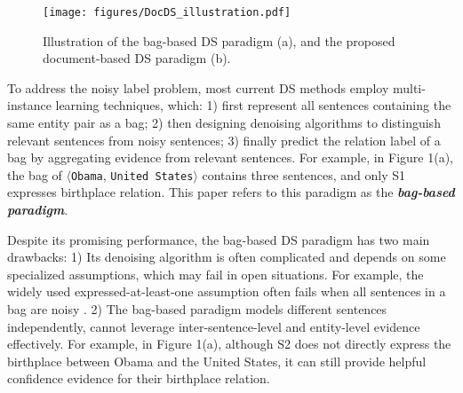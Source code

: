 \documentclass[11pt,a4paper]{article}
\begin{document}
  \begin{figure}[!tbp]
    \setlength{\belowcaptionskip}{-1em}
    \centering  
    \texttt{[image: figures/DocDS\_illustration.pdf]}
   \caption{Illustration of the bag-based DS paradigm (a), and the proposed document-based DS paradigm (b).}
    \label{fig:fig1}
  \end{figure}
  
  To address the noisy label problem, most current DS methods \cite{riedel_modeling_2010,zeng_distant_2015,lin_neural_2016, yuan_crossrelation_2018, ye_distant_2019} employ multi-instance learning techniques, which: 
  1) first represent all sentences containing the same entity pair as a bag; 
  2) then designing denoising algorithms to distinguish relevant sentences from noisy sentences;
  3) finally predict the relation label of a bag by aggregating evidence from relevant sentences.
  For example, in Figure 1(a), the bag of $\langle$\texttt{Obama}, \texttt{United States}$\rangle$ contains three sentences, and only S1 expresses birthplace relation.
  This paper refers to this paradigm as the \textbf{\emph{bag-based paradigm}}.
  
  Despite its promising performance, the bag-based DS paradigm has two main drawbacks:
  1) Its denoising algorithm is often complicated and depends on some specialized assumptions, which may fail in open situations.
  For example, the widely used expressed-at-least-one assumption \cite{riedel_modeling_2010} often fails when all sentences in a bag are noisy \cite{ye_distant_2019}.
  2) The bag-based paradigm models different sentences independently, cannot leverage inter-sentence-level and entity-level evidence effectively.
  For example, in Figure 1(a), although S2 does not directly express the birthplace between Obama and the United States, it can still provide helpful confidence evidence for their birthplace relation.
  
\end{document}
